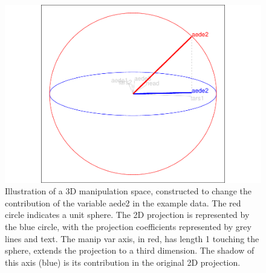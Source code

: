 \begin{Schunk}
\begin{figure}

{\centering \includegraphics[width=0.7\linewidth]{spinifex_paper_files/figure-latex/step2-1} 

}

\caption[Illustration of a 3D manipulation space, constructed to change the contribution of the variable aede2 in the example data]{Illustration of a 3D manipulation space, constructed to change the contribution of the variable aede2 in the example data. The red circle indicates a unit sphere. The 2D projection is represented by the blue circle, with the projection coefficients represented by grey lines and text. The manip var axis, in red, has length 1 touching the sphere, extends the projection to a third dimension. The shadow of this axis (blue) is its contribution in the original 2D projection.}\label{fig:step2}
\end{figure}
\end{Schunk}

